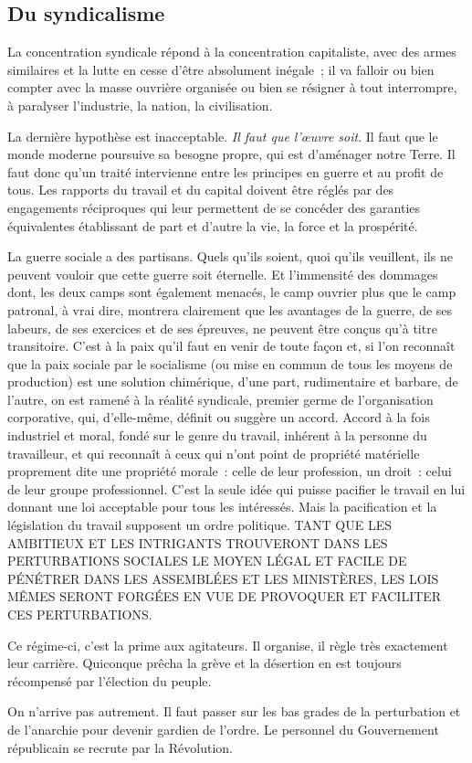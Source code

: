 \documentclass[french,twoside]{book} %
\newcommand\chapterclose{} %
\begin{document}
\subsection[{Du syndicalisme}]{Du syndicalisme}
\noindent La concentration syndicale répond à la concentration capitaliste, avec des armes similaires et la lutte en cesse d’être absolument inégale ; il va falloir ou bien compter avec la masse ouvrière organisée ou bien se résigner à tout interrompre, à paralyser l’industrie, la nation, la civilisation.\par
La dernière hypothèse est inacceptable. \emph{Il faut que l’œuvre soit}. Il faut que le monde moderne poursuive sa besogne propre, qui est d’aménager notre Terre. Il faut donc qu’un traité intervienne entre les principes en guerre et au profit de tous. Les rapports du travail et du capital doivent être réglés par des engagements réciproques qui leur permettent de se concéder des garanties équivalentes établissant de part et d’autre la vie, la force et la prospérité.\par
La guerre sociale a des partisans. Quels qu’ils soient, quoi qu’ils veuillent, ils ne peuvent vouloir que cette guerre soit éternelle. Et l’immensité des dommages dont, les deux camps sont également menacés, le camp ouvrier plus que le camp patronal, à vrai dire, montrera clairement que les avantages de la guerre, de ses labeurs, de ses exercices et de ses épreuves, ne peuvent être conçus qu’à titre transitoire. C’est à la paix qu’il faut en venir de toute façon et, si l’on reconnaît que la paix sociale par le socialisme (ou mise en commun de tous les moyens de production) est une solution chimérique, d’une part, rudimentaire et barbare, de l’autre, on est ramené à la réalité syndicale, premier germe de l’organisation corporative, qui, d’elle-même, définit ou suggère un accord. Accord à la fois industriel et moral, fondé sur le genre du travail, inhérent à la personne du travailleur, et qui reconnaît à ceux qui n’ont point de propriété matérielle proprement dite une propriété morale : celle de leur profession, un droit : celui de leur groupe professionnel. C’est la seule idée qui puisse pacifier le travail en lui donnant une loi acceptable pour tous les intéressés. Mais la pacification et la législation du travail supposent un ordre politique. TANT QUE LES AMBITIEUX ET LES INTRIGANTS TROUVERONT DANS LES PERTURBATIONS SOCIALES LE MOYEN LÉGAL ET FACILE DE PÉNÉTRER DANS LES ASSEMBLÉES ET LES MINISTÈRES, LES LOIS MÊMES SERONT FORGÉES EN VUE DE PROVOQUER ET FACILITER CES PERTURBATIONS.\par
Ce régime-ci, c’est la prime aux agitateurs. Il organise, il règle très exactement leur carrière. Quiconque prêcha la grève et la désertion en est toujours récompensé par l’élection du peuple.\par
On n’arrive pas autrement. Il faut passer sur les bas grades de la perturbation et de l’anarchie pour devenir gardien de l’ordre. Le personnel du Gouvernement républicain se recrute par la Révolution.
\chapterclose
\end{document}
